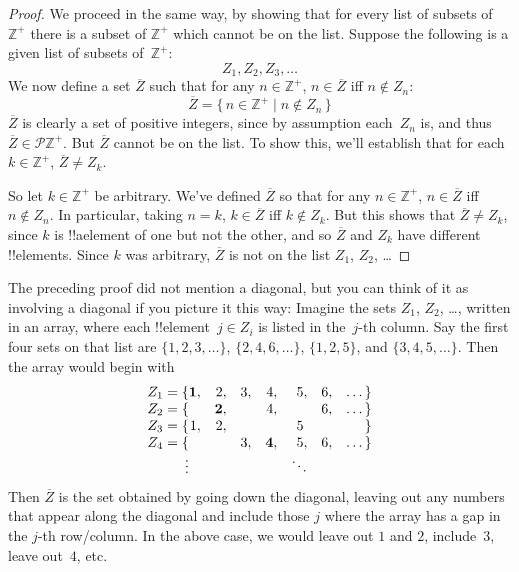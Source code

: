 \documentclass[10pt,a4paper]{article}
\theoremstyle{plain}
\theoremstyle{definition}
\theoremstyle{remark}
\newenvironment{explain}{}{}
\providecommand{\PosInt}{\mathbb{Z}^{+}}
\providecommand{\Pow}{\mathcal{P}}
\providecommand{\Setabs}[2]{\{\, #1 \mid #2 \,\}}
\begin{document}
\begin{proof}
We proceed in the same way, by showing that for every list of subsets
of~$\PosInt$ there is a subset of $\PosInt$ which cannot be on the list.
Suppose the following is a given list of subsets of~$\PosInt$:
\[
Z_{1}, Z_{2}, Z_{3}, \dots
\]
We now define a set $\overline{Z}$ such that for any $n \in \PosInt$,
$n \in \overline{Z}$ iff $n \notin Z_{n}$:
\[
\overline{Z} = \Setabs{n \in \PosInt}{n \notin Z_n}
\]
$\overline{Z}$ is clearly a set of positive integers, since by
assumption each~$Z_n$ is, and thus $\overline{Z} \in
\Pow{\PosInt}$. But $\overline{Z}$ cannot be on the list.  To show
this, we'll establish that for each $k \in \PosInt$, $\overline{Z} \neq
Z_k$. 

So let $k \in \PosInt$ be arbitrary. We've defined $\overline{Z}$ so
that for any $n \in \PosInt$, $n \in \overline{Z}$ iff $n \notin Z_n$.
In particular, taking $n=k$, $k \in \overline{Z}$ iff $k \notin Z_k$.
But this shows that $\overline{Z} \neq Z_k$, since $k$ is !!a{element}
of one but not the other, and so $\overline{Z}$ and $Z_k$ have
different !!{element}s. Since $k$ was arbitrary, $\overline{Z}$ is not
on the list $Z_1$, $Z_2$, \dots
\end{proof}

\begin{explain}
The preceding proof did not mention a diagonal, but you can think of
it as involving a diagonal if you picture it this way: Imagine the
sets $Z_1$, $Z_2$, \dots, written in an array, where each
!!{element}~$j \in Z_i$ is listed in the~$j$-th column. Say the first
four sets on that list are $\{1,2,3,\dots\}$, $\{2, 4, 6, \dots\}$,
$\{1,2,5\}$, and $\{3,4,5,\dots\}$. Then the array would begin with
\[
\begin{array}{r@{}rrrrrrr}
  Z_1 = \{ & \mathbf{1}, & 2, & 3, & 4, & 5, & 6, & \dots\}\\
  Z_2 = \{ &  & \mathbf{2}, &  & 4, &  & 6, & \dots\}\\
  Z_3 = \{ & 1, & 2, &  &  & 5\phantom{,} &  & \}\\
  Z_4 = \{ &  &  & 3, & \mathbf{4}, & 5, & 6, & \dots\}\\
  \vdots & & & & & \ddots
\end{array}
\]
Then $\overline{Z}$ is the set obtained by going down the diagonal,
leaving out any numbers that appear along the diagonal and include
those $j$ where the array has a gap in the $j$-th row/column. In the
above case, we would leave out $1$ and $2$, include~$3$, leave
out~$4$, etc.
\end{explain}
\end{document}
